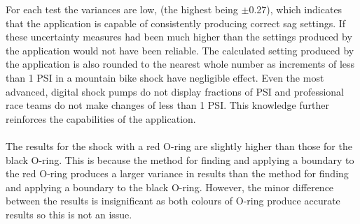			For each test the variances are low, (the highest being $\pm$0.27), which indicates that the application is capable of consistently producing correct sag settings. If these uncertainty measures had been much higher than the settings produced by the application would not have been reliable. The calculated setting produced by the application is also rounded to the nearest whole number as increments of less than 1 PSI in a mountain bike shock have negligible effect. Even the most advanced, digital shock pumps do not display fractions of PSI and professional race teams do not make changes of less than 1 PSI. This knowledge further reinforces the capabilities of the application.
			\\\\
			The results for the shock with a red O-ring are slightly higher than those for the black O-ring. This is because the method for finding and applying a boundary to the red O-ring produces a larger variance in results than the method for finding and applying a boundary to the black O-ring. However, the minor difference between the results is insignificant as both colours of O-ring produce accurate results so this is not an issue.
